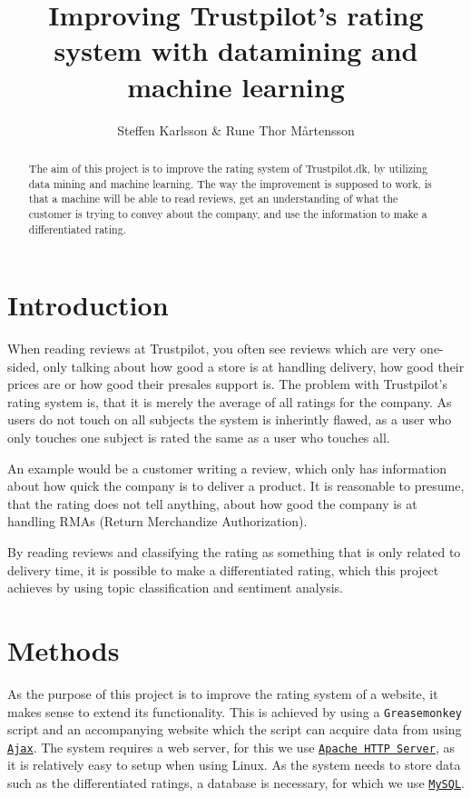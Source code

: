 \documentclass[10pt]{IEEEtran}
\title{Improving Trustpilot's rating system with datamining and machine learning}
\author{Steffen Karlsson \& Rune Thor Mårtensson}
\begin{document}
\maketitle

\begin{abstract}
The aim of this project is to improve the rating system of Trustpilot.dk, by utilizing data mining and machine learning. The way the improvement is supposed to work, is that a machine will be able to read reviews, get an understanding of what the customer is trying to convey about the company, and use the information to make a differentiated rating.
\end{abstract}

\section{Introduction}
When reading reviews at Trustpilot, you often see reviews which are very one-sided, only talking about how good a store is at handling delivery, how good their prices are or how good their presales support is. The problem with Trustpilot's rating system is, that it is merely the average of all ratings for the company. As users do not touch on all subjects the system is inherintly flawed, as a user who only touches one subject is rated the same as a user who touches all.

An example would be a customer writing a review, which only has information about how quick the company is to deliver a product. It is reasonable to presume, that the rating does not tell anything, about how good the company is at handling RMAs (Return Merchandize Authorization). 

By reading reviews and classifying the rating as something that is only related to delivery time, it is possible to make a differentiated rating, which this project achieves by using topic classification and sentiment analysis.

\section{Methods}
As the purpose of this project is to improve the rating system of a website, it makes sense to extend its functionality. This is achieved by using a \texttt{Greasemonkey}\cite{GreaseMonkey} script and an accompanying website which the script can acquire data from using \href{http://en.wikipedia.org/wiki/Ajax_(programming)}{\texttt{Ajax}}.
The system requires a web server, for this we use \href{http://httpd.apache.org/}{\texttt{Apache HTTP Server}}, as it is relatively easy to setup when using Linux. As the system needs to store data such as the differentiated ratings, a database is necessary, for which we use \href{http://www.mysql.com/}{\texttt{MySQL}}.
\end{document}
